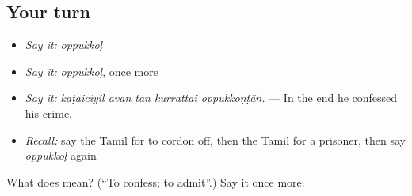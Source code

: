 \subsection*{Your turn}
\begin{itemize}
\raggedright
  \item \emph{Say it:} \emph{oppukkoḷ}
  \item \emph{Say it:} \emph{oppukkoḷ}, once more
  \item \emph{Say it:} \emph{kaṭaiciyil avaṉ taṉ kuṟṟattai oppukkoṇṭāṉ.} — In the end he confessed his crime.
  \item \emph{Recall:} say the Tamil for to cordon off, then the Tamil for a prisoner, then say \emph{oppukkoḷ} again
\end{itemize}

\begin{tcolorbox}[breakable,colback=teal!4,colframe=teal!35!black,title={Before you move on}]
What does  mean? (\textquotedblleft{}To confess; to admit\textquotedblright{}.) Say it once more.
\end{tcolorbox}
